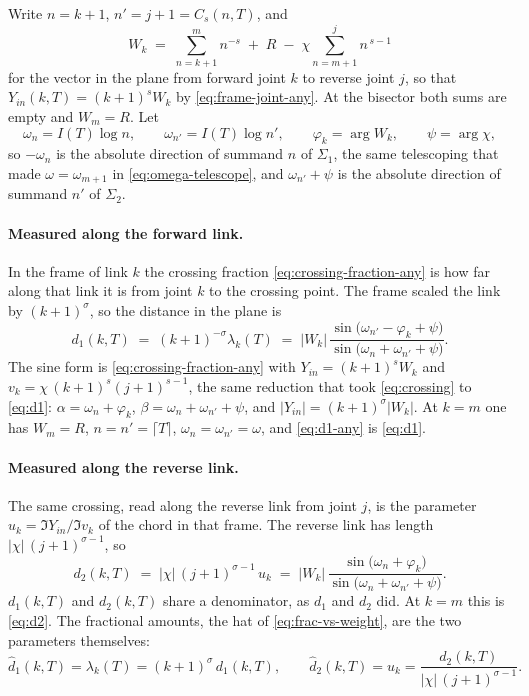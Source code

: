 \documentclass[11pt]{article}
\theoremstyle{definition}
\begin{document}
Write $n=k+1$, $n'=j+1=C_{s}(n,T)$, and
\begin{equation}\label{eq:W-any}
W_k
\;=\;
\sum_{n=k+1}^{m}n^{-s}
\;+\;R
\;-\;\chi\sum_{n=m+1}^{j}n^{\,s-1}
\end{equation}
for the vector in the plane from forward joint $k$ to reverse joint $j$, so
that $Y_{in}(k,T)=(k+1)^{s}W_k$ by \eqref{eq:frame-joint-any}. At the
bisector both sums are empty and $W_m=R$. Let
\begin{equation}\label{eq:omega-any}
\omega_n=I(T)\log n,
\qquad
\omega_{n'}=I(T)\log n',
\qquad
\varphi_k=\arg W_k,
\qquad
\psi=\arg\chi,
\end{equation}
so $-\omega_n$ is the absolute direction of summand $n$ of $\Sigma_1$, the
same telescoping that made $\omega=\omega_{m+1}$ in \eqref{eq:omega-telescope},
and $\omega_{n'}+\psi$ is the absolute direction of summand $n'$ of
$\Sigma_2$.

\paragraph{Measured along the forward link.} In the frame of link $k$ the crossing fraction
\eqref{eq:crossing-fraction-any} is how far along that link it is from joint
$k$ to the crossing point. The frame scaled the link by $(k+1)^{\sigma}$, so the distance
in the plane is
\begin{equation}\label{eq:d1-any}
d_1(k,T)
\;=\;
(k+1)^{-\sigma}\lambda_k(T)
\;=\;
|W_k|\,
\frac{\sin\!\bigl(\omega_{n'}-\varphi_k+\psi\bigr)}
     {\sin\!\bigl(\omega_n+\omega_{n'}+\psi\bigr)}.
\end{equation}
The sine form is \eqref{eq:crossing-fraction-any} with
$Y_{in}=(k+1)^{s}W_k$ and $v_k=\chi\,(k+1)^{s}(j+1)^{s-1}$, the same
reduction that took \eqref{eq:crossing} to \eqref{eq:d1}:
$\alpha=\omega_n+\varphi_k$, $\beta=\omega_n+\omega_{n'}+\psi$, and
$|Y_{in}|=(k+1)^{\sigma}|W_k|$. At $k=m$ one has $W_m=R$,
$n=n'=\lceil T\rceil$, $\omega_n=\omega_{n'}=\omega$, and
\eqref{eq:d1-any} is \eqref{eq:d1}.

\paragraph{Measured along the reverse link.} The same crossing, read along the reverse
link from joint $j$, is the parameter
$u_k=\Im Y_{in}/\Im v_k$ of the chord in that frame. The reverse link has
length $|\chi|\,(j+1)^{\sigma-1}$, so
\begin{equation}\label{eq:d2-any}
d_2(k,T)
\;=\;
|\chi|\,(j+1)^{\sigma-1}\,u_k
\;=\;
|W_k|\,
\frac{\sin\!\bigl(\omega_n+\varphi_k\bigr)}
     {\sin\!\bigl(\omega_n+\omega_{n'}+\psi\bigr)}.
\end{equation}
$d_1(k,T)$ and $d_2(k,T)$ share a denominator, as $d_1$ and $d_2$ did. At $k=m$ this
is \eqref{eq:d2}. The fractional amounts, the hat of
\eqref{eq:frac-vs-weight}, are the two parameters themselves:
\begin{equation}\label{eq:hat-any}
\hat d_1(k,T)=\lambda_k(T)=(k+1)^{\sigma}\,d_1(k,T),
\qquad
\hat d_2(k,T)=u_k=\frac{d_2(k,T)}{|\chi|\,(j+1)^{\sigma-1}}.
\end{equation}
\end{document}
